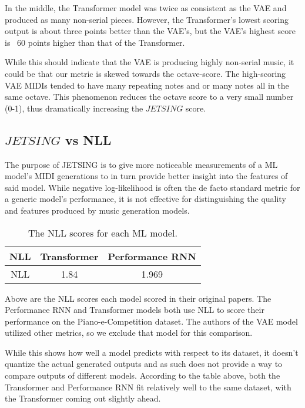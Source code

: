 \documentclass[11pt]{article}
\begin{document}
In the middle, the Transformer model was twice as consistent as the VAE and produced as many non-serial pieces.
However, the Transformer's lowest scoring output is about three points better than the VAE's, but the VAE's highest score is ~60 points higher than that of the Transformer. 

While this should indicate that the VAE is producing highly non-serial music, it could be that our metric is skewed towards the octave-score.
The high-scoring VAE MIDIs tended to have many repeating notes and or many notes all in the same octave.
This phenomenon reduces the octave score to a very small number (0-1), thus dramatically increasing the $JETSING$ score.

\subsection{$JETSING$ vs NLL}

The purpose of JETSING is to give more noticeable measurements of a ML model's MIDI generations to in turn provide better insight into the features of said model.
While negative log-likelihood is often the de facto standard metric for a generic model's performance,
it is not effective for distinguishing the quality and features produced by music generation models.

\begin{table}[h!]
    \centering
    \caption{The NLL scores for each ML model.}
    \begin{tabular}{c c c}
        \hline
        NLL & Transformer & Performance RNN \\
        \hline
        NLL & 1.84 & 1.969 \\
        \hline
    \end{tabular}
\end{table}

Above are the NLL scores each model scored in their original papers.
The Performance RNN and Transformer models both use NLL to score their performance on the Piano-e-Competition dataset.
The authors of the VAE model utilized other metrics, so we exclude that model for this comparison.

While this shows how well a model predicts with respect to its dataset, it doesn't quantize the actual generated outputs and as such does not provide a way to compare outputs of different models.
According to the table above, both the Transformer and Performance RNN fit relatively well to the same dataset, with the Transformer coming out slightly ahead.
\end{document}
